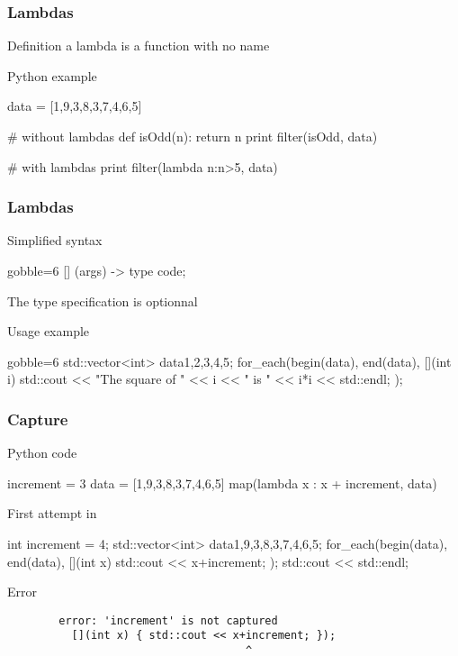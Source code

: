 \begin{frame}[fragile]
  \frametitle{Lambdas}
  \begin{block}{Definition}
    a lambda is a function with no name
  \end{block}
  \pause
  \begin{exampleblock}{Python example}
    \begin{pythoncode*}{}
      data = [1,9,3,8,3,7,4,6,5]

      # without lambdas
      def isOdd(n):
        return n%
      print filter(isOdd, data)

      # with lambdas
      print filter(lambda n:n>5, data)
    \end{pythoncode*}
  \end{exampleblock}
\end{frame}

\begin{frame}[fragile]
  \frametitle{\cpp Lambdas}
  \begin{block}{Simplified syntax}
    \begin{cppcode*}{gobble=6}
      [] (args) -> type {
        code;
      }
    \end{cppcode*}
    The type specification is optionnal
  \end{block}
  \begin{exampleblock}{Usage example}
    \begin{cppcode*}{gobble=6}
      std::vector<int> data{1,2,3,4,5};
      for_each(begin(data), end(data),
               [](int i) {
                 std::cout << "The square of " << i
                           << " is " << i*i << std::endl;
               });
    \end{cppcode*}
  \end{exampleblock}
\end{frame}


\begin{frame}[fragile]
  \frametitle{Capture}
  \begin{block}{Python code}
    \begin{pythoncode*}{}
      increment = 3
      data = [1,9,3,8,3,7,4,6,5]
      map(lambda x : x + increment, data)
    \end{pythoncode*}
  \end{block}
  \pause
  \begin{block}{First attempt in \cpp}
    \begin{cppcode}
      int increment = 4;
      std::vector<int> data{1,9,3,8,3,7,4,6,5};
      for_each(begin(data), end(data),
               [](int x) { std::cout << x+increment; });
      std::cout << std::endl;
    \end{cppcode}
  \end{block}
  \pause
  \begin{alertblock}{Error}
    \begin{verbatim}
        error: 'increment' is not captured
          [](int x) { std::cout << x+increment; });
                                     ^
    \end{verbatim}
  \end{alertblock}
\end{frame}

